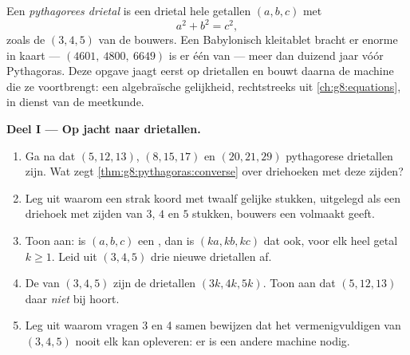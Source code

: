 \begin{problem}[{Weekendopgave --- rechthoekige driehoeken met hele getallen,
en het merkwaardige product $(m^2 - n^2)^2 + (2mn)^2 = (m^2 + n^2)^2$ dat ze
allemaal voortbrengt}]
\label{pb:g8:pythagoras:1}
Een \emph{pythagorees drietal} is een drietal hele
getallen $(a, b, c)$ met
\[
a^2 + b^2 = c^2 ,
\]
zoals de $(3, 4, 5)$ van de bouwers. Een Babylonisch kleitablet bracht er
enorme in kaart --- $(4601,\ 4800,\ 6649)$ is er één van --- meer dan duizend
jaar vóór Pythagoras. Deze opgave jaagt eerst op drietallen en bouwt daarna de
machine die ze voortbrengt: een algebraïsche gelijkheid, rechtstreeks uit
\cref{ch:g8:equations}, in dienst van de meetkunde.

\medskip
\noindent\textbf{Deel I --- Op jacht naar drietallen.}
\begin{enumerate}
  \item Ga na dat $(5, 12, 13)$, $(8, 15, 17)$ en $(20, 21, 29)$ pythagorese
        drietallen zijn. Wat zegt \cref{thm:g8:pythagoras:converse} over
        driehoeken met deze zijden?
  \item Leg uit waarom een strak koord met twaalf gelijke stukken, uitgelegd als
        een driehoek met zijden van $3$, $4$ en $5$ stukken, bouwers een
        volmaakt  geeft.
  \item Toon aan: is $(a, b, c)$ een , dan is
        $(ka, kb, kc)$ dat ook, voor elk heel getal $k \geq 1$. Leid uit
        $(3, 4, 5)$ drie nieuwe drietallen af.
  \item De  van $(3, 4, 5)$ zijn de drietallen $(3k, 4k, 5k)$. Toon
        aan dat $(5, 12, 13)$ daar \emph{niet} bij hoort.
  \item Leg uit waarom vragen 3 en 4 samen bewijzen dat het vermenigvuldigen van
        $(3, 4, 5)$ nooit elk  kan opleveren: er is een andere
        machine nodig.
\end{enumerate}


\end{problem}
